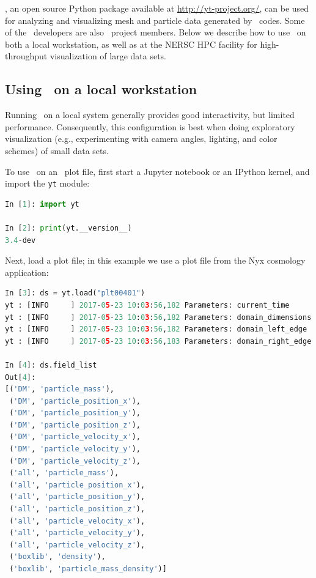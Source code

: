 \yt, an open source Python package available at \url{http://yt-project.org/},
can be used for analyzing and visualizing mesh and particle data generated by
\amrex\ codes.  Some of the \amrex\ developers are also \yt\ project members.
Below we describe how to use \yt\ on both a local workstation, as well as at
the NERSC HPC facility for high-throughput visualization of large data sets.

\subsection{Using \yt\ on a local workstation}

Running \yt\ on a local system generally provides good interactivity, but
limited performance. Consequently, this configuration is best when doing
exploratory visualization (e.g., experimenting with camera angles, lighting,
and color schemes) of small data sets.

To use \yt\ on an \amrex\ plot file, first start a Jupyter notebook or an IPython kernel, and import the \texttt{yt} module:

\begin{lstlisting}[language=python,breaklines=true]
In [1]: import yt

In [2]: print(yt.__version__)
3.4-dev
\end{lstlisting}

Next, load a plot file; in this example we use a plot file from the Nyx cosmology application:

\begin{lstlisting}[language=python,breaklines=true]
In [3]: ds = yt.load("plt00401")
yt : [INFO     ] 2017-05-23 10:03:56,182 Parameters: current_time              = 0.00605694344696544
yt : [INFO     ] 2017-05-23 10:03:56,182 Parameters: domain_dimensions         = [128 128 128]
yt : [INFO     ] 2017-05-23 10:03:56,182 Parameters: domain_left_edge          = [ 0.  0.  0.]
yt : [INFO     ] 2017-05-23 10:03:56,183 Parameters: domain_right_edge         = [ 14.24501  14.24501  14.24501]

In [4]: ds.field_list
Out[4]:
[('DM', 'particle_mass'),
 ('DM', 'particle_position_x'),
 ('DM', 'particle_position_y'),
 ('DM', 'particle_position_z'),
 ('DM', 'particle_velocity_x'),
 ('DM', 'particle_velocity_y'),
 ('DM', 'particle_velocity_z'),
 ('all', 'particle_mass'),
 ('all', 'particle_position_x'),
 ('all', 'particle_position_y'),
 ('all', 'particle_position_z'),
 ('all', 'particle_velocity_x'),
 ('all', 'particle_velocity_y'),
 ('all', 'particle_velocity_z'),
 ('boxlib', 'density'),
 ('boxlib', 'particle_mass_density')]
\end{lstlisting}

